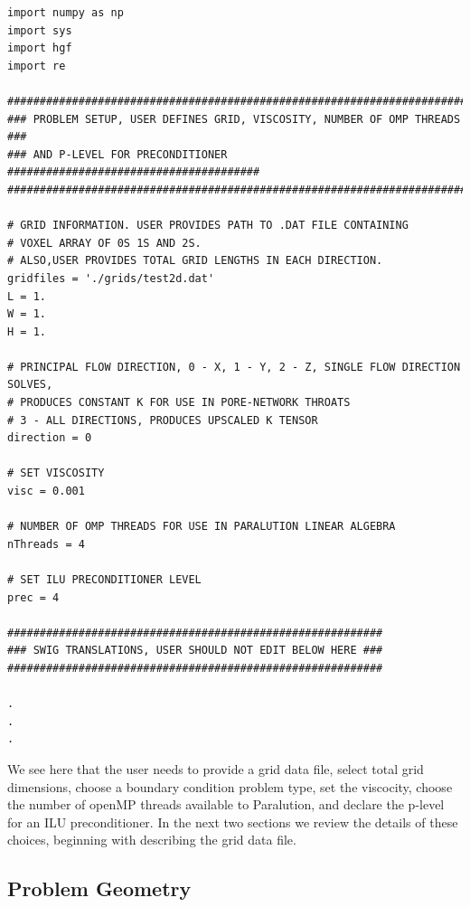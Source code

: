 \documentclass{report}
\begin{document}
\lstset{style=custom}
\begin{lstlisting}
import numpy as np
import sys
import hgf
import re

##########################################################################
### PROBLEM SETUP, USER DEFINES GRID, VISCOSITY, NUMBER OF OMP THREADS ###
### AND P-LEVEL FOR PRECONDITIONER #######################################
##########################################################################

# GRID INFORMATION. USER PROVIDES PATH TO .DAT FILE CONTAINING
# VOXEL ARRAY OF 0S 1S AND 2S.
# ALSO,USER PROVIDES TOTAL GRID LENGTHS IN EACH DIRECTION.
gridfiles = './grids/test2d.dat'
L = 1.
W = 1.
H = 1.

# PRINCIPAL FLOW DIRECTION, 0 - X, 1 - Y, 2 - Z, SINGLE FLOW DIRECTION SOLVES,
# PRODUCES CONSTANT K FOR USE IN PORE-NETWORK THROATS
# 3 - ALL DIRECTIONS, PRODUCES UPSCALED K TENSOR
direction = 0

# SET VISCOSITY
visc = 0.001

# NUMBER OF OMP THREADS FOR USE IN PARALUTION LINEAR ALGEBRA
nThreads = 4

# SET ILU PRECONDITIONER LEVEL
prec = 4

##########################################################
### SWIG TRANSLATIONS, USER SHOULD NOT EDIT BELOW HERE ###
##########################################################

.
.
.
\end{lstlisting}

\noindent We see here that the user needs to provide a grid data file,
select total grid dimensions, choose a boundary condition
problem type, set the viscocity, choose the number of openMP
threads available to Paralution, and declare the p-level for an ILU preconditioner.
In the next two sections we review the details of these choices, beginning
with describing the grid data file.

\subsection{Problem Geometry}
\end{document}

